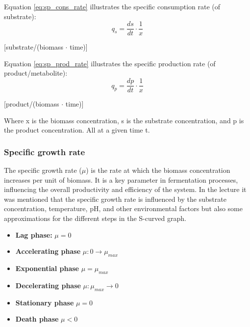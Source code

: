 \vspace{0.5em}
Equation \ref*{eq:sp_cons_rate} illustrates the specific consumption rate (of substrate):
\begin{equation}
    q_s = \frac{ds}{dt} \cdot \frac{1}{x}
    \label{eq:sp_cons_rate}
\end{equation}  
\begin{center}
    \footnotesize{[substrate/(biomass $\cdot$ time)]}
\end{center}

\vspace{0.5em}
Equation \ref*{eq:sp_prod_rate} illustrates the specific production rate (of product/metabolite):
\begin{equation}
    q_p = \frac{dp}{dt} \cdot \frac{1}{x}
    \label{eq:sp_prod_rate}
\end{equation}
\begin{center}
    \footnotesize{[product/(biomass $\cdot$ time)]}
\end{center}

Where x is the biomass concentration, s is the substrate concentration, and p is the product concentration. All at a given time t.

\subsubsection*{Specific growth rate}
The specific growth rate ($\mu$) is the rate at which the biomass concentration increases per unit of biomass. It is a key parameter in fermentation processes, influencing the overall productivity and efficiency of the system. In the lecture it was mentioned that the specific growth rate is influenced by the substrate concentration, temperature, pH, and other environmental factors but also some approximations for the different steps in the S-curved graph.

\begin{highlight}
    \begin{itemize}
        \item \textbf{Lag phase:} $\mu = 0$
        \item \textbf{Accelerating phase} $\mu: 0 \rightarrow \mu_{max}$
        \item \textbf{Exponential phase} $\mu = \mu_{max}$
        \item \textbf{Decelerating phase} $\mu: \mu_{max} \rightarrow 0$
        \item \textbf{Stationary phase} $\mu = 0$
        \item \textbf{Death phase} $\mu < 0$
    \end{itemize}
\end{highlight}

